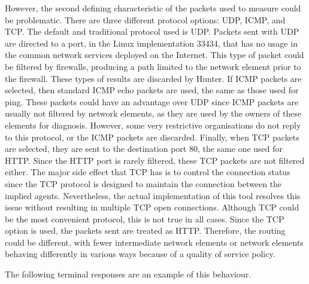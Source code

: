 However, the second defining characteristic of the packets used to measure could be problematic. There are three different protocol options: UDP, ICMP, and TCP. The default and traditional protocol used is UDP. Packets sent with UDP are directed to a port, in the Linux implementation 33434, that has no usage in the common network services deployed on the Internet. This type of packet could be filtered by firewalls, producing a path limited to the network element prior to the firewall. These types of results are discarded by Hunter. If ICMP packets are selected, then standard ICMP echo packets are used, the same as those used for ping. These packets could have an advantage over UDP since ICMP packets are usually not filtered by network elements, as they are used by the owners of these elements for diagnosis. However, some very restrictive organisations do not reply to this protocol, or the ICMP packets are discarded. Finally, when TCP packets are selected, they are sent to the destination port 80, the same one used for HTTP. Since the HTTP port is rarely filtered, these TCP packets are not filtered either. The major side effect that TCP has is to control the connection status since the TCP protocol is designed to maintain the connection between the implied agents. Nevertheless, the actual implementation of this tool resolves this issue without resulting in multiple TCP open connections. Although TCP could be the most convenient protocol, this is not true in all cases. Since the TCP option is used, the packets sent are treated as HTTP. Therefore, the routing could be different, with fewer intermediate network elements or network elements behaving differently in various ways because of a quality of service policy.

 The following terminal responses are an example of this behaviour.

